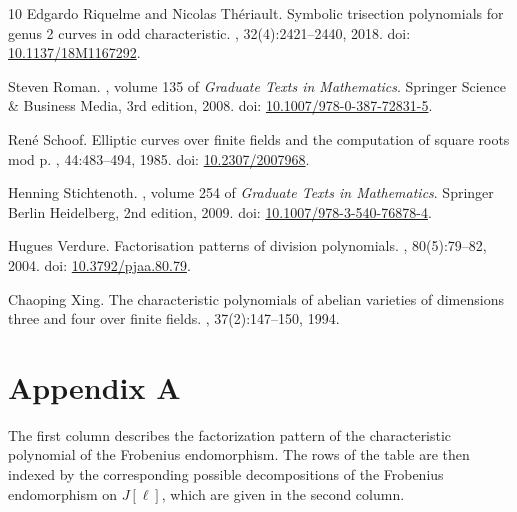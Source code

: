 \documentclass[11pt,a4paper]{article}
\theoremstyle{plain}
\theoremstyle{definition}
\theoremstyle{remark}
\begin{document}
\begin{thebibliography}{10}
Edgardo Riquelme and Nicolas Th{\'e}riault.
\newblock Symbolic trisection polynomials for genus 2 curves in odd
  characteristic.
, 32(4):2421--2440, 2018.
\newblock doi: \href{https://doi.org/10.1137/18M1167292}{10.1137/18M1167292}.

Steven Roman.
, volume 135 of {\em Graduate Texts in
  Mathematics}.
\newblock Springer Science \& Business Media, 3rd edition, 2008.
\newblock doi:
  \href{https://doi.org/10.1007/978-0-387-72831-5}{10.1007/978-0-387-72831-5}.

Ren{\'e} Schoof.
\newblock Elliptic curves over finite fields and the computation of square
  roots mod p.
, 44:483--494, 1985.
\newblock doi: \href{https://doi.org/10.2307/2007968}{10.2307/2007968}.

Henning Stichtenoth.
, volume 254 of {\em
  Graduate Texts in Mathematics}.
\newblock Springer Berlin Heidelberg, 2nd edition, 2009.
\newblock doi:
  \href{https://doi.org/10.1007/978-3-540-76878-4}{10.1007/978-3-540-76878-4}.

Hugues Verdure.
\newblock Factorisation patterns of division polynomials.
, 80(5):79--82, 2004.
\newblock doi: \href{https://doi.org/10.3792/pjaa.80.79}{10.3792/pjaa.80.79}.

Chaoping Xing.
\newblock The characteristic polynomials of abelian varieties of dimensions
  three and four over finite fields.
, 37(2):147--150, 1994.

\end{thebibliography}







\newpage
\section*{Appendix A}\label{appendixa}
The first column describes the factorization pattern of the characteristic polynomial of the Frobenius endomorphism. The rows of the table are then indexed by the corresponding possible decompositions of the Frobenius endomorphism on $J[\ell]$, which are given in the second column.
\end{document}
